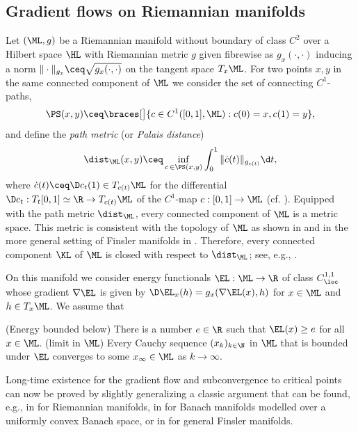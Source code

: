 \subsection{Gradient flows on Riemannian manifolds}
\label{sec:grad_flows}
Let $(\ML,g)$ be a Riemannian manifold without boundary 
of class $C^2$ over a Hilbert 
space $\HL$ with  Riemannian metric $g$ given fibrewise as 
$g_x(\cdot,\cdot)$ 
inducing a norm $\|\cdot\|_{g_x} \ceq \sqrt{g_x(\cdot,\cdot)}$ on 
the tangent space $T_x\ML$. 
For two points $x,y$ 
in the same connected component of $\ML$ we consider
the  set of connecting $C^1$-paths,
\begin{equation}\label{eq:path-space}
	\PS(x,y) 
	\ceq \braces[\big]{c\in C^1([0,1],\ML) : c(0)=x,c(1)=y},
\end{equation}
and define the \emph{path metric} (or \emph{Palais distance})
\begin{equation}\label{eq:path-metric}
\dist_{\ML}(x,y) \ceq \inf_{c\,\in\PS(x,y)}\int_0^1
\|\dot{c}(t)\|_{g_{c(t)}}\d t,
\end{equation}
where $\dot{c}(t) \ceq \D c_t(1)\in T_{c(t)}\ML$
for the differential $\D c_t:T_t[0,1]\simeq\R\to
T_{c(t)}\ML$ of the $C^1$-map $c:[0,1]\to\ML$ (cf.{} \cite[Sections 6 \& 9]{palais_1963}).
Equipped with the path metric $\dist_{\ML}$, every connected
component
of 
$\ML$ is a metric space. This metric is consistent with the
topology of $\ML$ as shown in \cite[Section 9]{palais_1963}
and in the more general setting of Finsler manifolds in
\cite[Theorem 3.3]{palais_1966}. Therefore, every connected
component $\KL$ of $\ML$ is closed with respect to $\dist_{\ML}$;
see, e.g., \cite[Remark after Theorem 25.2]{munkres_2000}.

On this manifold we consider energy functionals $\EL:\ML\to\R$ 
of class $C^{1,1}_\loc$ whose gradient $\nabla \EL$ is
given by $\D\EL_x(h)=g_x(\nabla\EL(x),h)$ for $x\in\ML$ and $h\in
T_x\ML$. We assume that
\begin{enumerate}
	\Item[\rm (e)]\label{lower-bound} 
	({\sc Energy bounded below})
	There is a number $e\in\R$ such that
	$\EL(x)\ge e$ for all $x\in\ML$.
	\Item[\rm (L**)]\label{condL**} 
	({\sc limit in $\ML$}) 
	Every Cauchy sequence
	$(x_k)_{k \in \N}$ in $\ML$ that is bounded under $\EL$
	converges to some 
	$x_\infty\in\ML$ as $k\to\infty$.
\end{enumerate}
Long-time existence for the gradient flow
and subconvergence to critical points can
now be proved by slightly generalizing a classic argument 
that can be found, e.g., in \cite[Theorem 9.1.6]{palais-terng_1988} 
for Riemannian manifolds, in \cite[Theorem 1.1]{browder_1965} 
for Banach manifolds modelled over a uniformly convex Banach space, or 
in \cite[Theorem 5.4]{palais_1966} for general Finsler manifolds.

